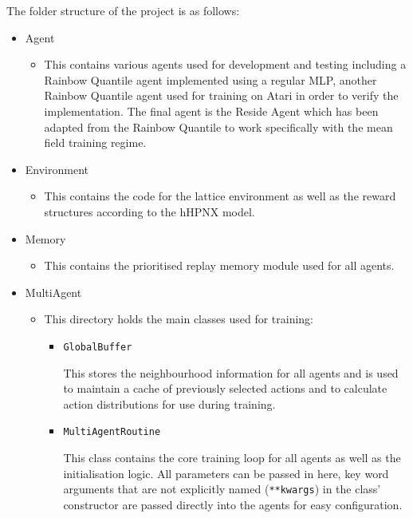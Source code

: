 The folder structure of the project is as follows:
\begin{itemize}
    \item Agent
    \begin{itemize}
        \item This contains various agents used for development and testing
        including a Rainbow Quantile agent implemented using a regular MLP,
        another Rainbow Quantile agent used for training on Atari in order
        to verify the implementation. The final agent is the Reside Agent
        which has been adapted from the Rainbow Quantile to work specifically
        with the mean field training regime.
    \end{itemize}
    \item Environment
    \begin{itemize}
        \item This contains the code for the lattice environment as well
        as the reward structures according to the hHPNX model.
    \end{itemize}
    \item Memory
    \begin{itemize}
        \item This contains the prioritised replay memory module
        used for all agents.
    \end{itemize}
    \item MultiAgent
    \begin{itemize}
        \item This directory holds the main classes used for training:
        \begin{itemize}
            \item \texttt{GlobalBuffer}

            This stores the neighbourhood information for all agents and is
            used to maintain a cache of previously selected actions and to 
            calculate action distributions for use during training.
            \item \texttt{MultiAgentRoutine}

            This class contains the core training loop for all agents as well
            as the initialisation logic. All parameters can be passed in here,
            key word arguments that are not explicitly named (\texttt{**kwargs})
            in the class' constructor are passed directly into the agents for 
            easy configuration. 


\end{itemize}
\end{itemize}
\end{itemize}
